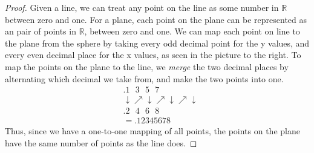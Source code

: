 \documentclass{article}
\begin{document}
\begin{multicols}{2}
  \begin{proof}
    Given a line, we can treat any point on the line as some number in $\mathbb{R}$ between zero and one. For a plane, each point on the plane can be represented as an pair of points in $\mathbb{R}$, between zero and one. We can map each point on line to the plane from the sphere by taking every odd decimal point for the y values, and every even decimal place for the x values, as seen in the picture to the right. To map the points on the plane to the line, we \textit{merge} the two decimal places by alternating which decimal we take from, and make the two points into one. 
\begin{align*}
&.1\ \ \ 3\ \ \ 5\ \ \ 7 \\
&\downarrow \nearrow \downarrow \nearrow \downarrow \nearrow \downarrow\\
&.2\ \ \ 4\ \ \ 6\ \ \ 8\\
&= .12345678
\end{align*}
Thus, since we have a one-to-one mapping of all points, the points on the plane have the same number of points as the line does.
  \end{proof}
  \begin{center}
  \end{center}
\end{multicols}
\end{document}
